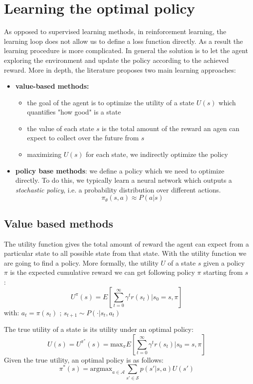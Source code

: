 \section{Learning the optimal policy}
As opposed to supervised learning methods, in reinforcement learning, the learning loop does not allow us to define a loss function directly. As a result the learning procedure is more complicated. In general the solution is to let the agent exploring the environment and update the policy according to the achieved reward. More in depth, the literature proposes two main learning approaches:
\begin{itemize}
    \item \textbf{value-based methods:}
    \begin{itemize}
        \item the goal of the agent is to optimize the utility of a state $U(s)$ which quantifies "how good" is a state
        \item the value of each state $s$ is the total amount of the reward an agen can expect to collect over the future from $s$
        \item maximizing $U(s)$ for each state, we indirectly optimize the policy
    \end{itemize}
    \item \textbf{policy base methods}: we define a policy which we need to optimize directly. To do this, we typically learn a neural network which outputs a \textit{stochastic policy}, i.e. a probability distribution over different actions.
    $$\pi_\theta (s,a) \approx P(a|s)$$
\end{itemize}

\subsection{Value based methods}
The utility function gives the total amount of reward the agent can expect from a particular state to all possible state from that state. With the utility function we are going to find a policy. More formally, the utility $U$ of a state $s$ given a policy $\pi$ is the expected cumulative reward we can get following policy $\pi$ starting from $s$:
\begin{equation}
    U^{\pi}(s) = E[\sum_{t=0}^{\infty} \gamma^t r(s_t) | s_0 = s, \pi] 
\end{equation}
with: $a_t = \pi(s_t)$ ; $s_{t+1} \sim P(\cdot | s_t, a_t)$ \newline

The true utility of a state is its utility under an optimal policy:
\begin{equation}
    U(s) = U^{\pi^{*}}(s) = \text{max}_{\pi} E[\sum_{t=0}^{\infty} \gamma^t r(s_t) | s_0 = s, \pi]
\end{equation}
Given the true utility, an optimal policy is as follows:
\begin{equation}
    \pi^*(s) = \text{argmax}_{a \in \mathcal{A}} \sum_{s' \in \mathcal{S}} p(s' | s, a) U(s')
\end{equation}

